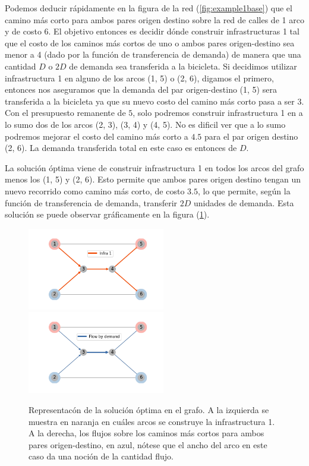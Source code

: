\documentclass{article}
\begin{document}
  Podemos deducir rápidamente en la figura de la red (\ref{fig:example1base}) que el camino más corto para ambos pares origen destino sobre la red de calles de 1 arco y de costo 6. El objetivo entonces es decidir dónde construir infrastructuras 1 tal que el costo de los caminos más cortos de uno o ambos pares origen-destino sea menor a 4 (dado por la función de transferencia de demanda) de manera que una cantidad $D$ o $2D$ de demanda sea transferida a la bicicleta. Si decidimos utilizar infrastructura 1 en alguno de los arcos (1, 5) o (2, 6), digamos el primero, entonces nos aseguramos que la demanda del par origen-destino (1, 5) sera transferida a la bicicleta ya que su nuevo costo del camino más corto pasa a ser $3$. Con el presupuesto remanente de $5$, solo podremos construir infrastructura 1 en a lo sumo dos de los arcos (2, 3), (3, 4) y (4, 5). No es dificil ver que a lo sumo podremos mejorar el costo del camino más corto a $4.5$ para el par origen destino (2, 6). La demanda transferida total en este caso es entonces de $D$.

  La solución óptima viene de construir infrastructura 1 en todos los arcos del grafo menos los (1, 5) y (2, 6). Esto permite que ambos pares origen destino tengan un nuevo recorrido como camino más corto, de costo $3.5$, lo que permite, según la función de transferencia de demanda, transferir $2D$ unidades de demanda. Esta solución se puede observar gráficamente en la figura (\ref{fig:example1solution}).

  \begin{figure}[h!]
    \centering
    \includegraphics[width=6cm]{../resources/example_1_infras.png}
    \includegraphics[width=6cm]{../resources/example_1_flows.png}
    \caption{Representacón de la solución óptima en el grafo. A la izquierda se muestra en naranja en cuáles arcos se construye la infrastructura 1. A la derecha, los flujos sobre los caminos más cortos para ambos pares origen-destino, en azul, nótese que el ancho del arco en este caso da una noción de la cantidad flujo.}
    \label{fig:example1solution}
  \end{figure}
\end{document}
